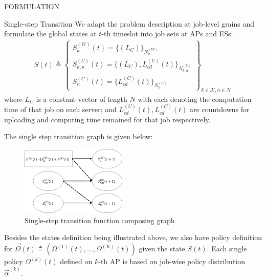 \documentclass[10pt, conference, letterpaper]{IEEEtran}
\begin{document}
\begin{section}{FORMULATION}
        \begin{subsection}{Single-step Transition}
            We adapt the problem description at job-level grains and formulate the global states at $t$-th timeslot into job sets at APs and ESs:
            \begin{align}
                S(t) \triangleq
                \begin{Bmatrix}
                    S_{k}^{(W)}(t) = \{ (L_C) \}_{N_{k}^{(W)}}
                    \\
                    S_{k,n}^{(U)}(t)= \{ (L_C), L_{cd}^{(U)}(t) \}_{N_{k,n}^{(U)}}
                    \\
                    S_{n}^{(C)}(t)  = \{ L_{cd}^{(C)}(t) \}_{N_{n}^{(C)}}
                \end{Bmatrix}_{k\in\mathcal{K}, n\in\mathcal{N}}
            \end{align}
            where $L_C$ is a constant vector of length $N$ with each denoting the computation time of that job on each server; and $L^{(U)}_{cd}(t), L^{(C)}_{cd}(t)$ are countdowns for uploading and computing time remained for that job respectively.
            
            The single step transition graph is given below:
            \begin{figure}[ht]
                \centering
                \includegraphics[width=0.45\textwidth]{single-transition.png}
                \caption{Single-step transition function composing graph}
                \label{fig:trans}
            \end{figure}
            Besides the states definition being illustrated above, we also have policy definition for $\vec{\Omega}(t) \triangleq (\Omega^{(1)}(t), \dots, \Omega^{(K)}(t))$ given the state $S(t)$. Each single policy $\Omega^{(k)}(t)$ defined on $k$-th AP is based on job-wise policy distribution $\vec{\alpha}^{(k)}$.


\end{subsection}
\end{section}
\end{document}
